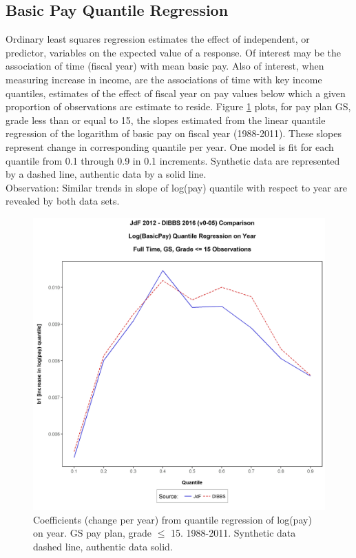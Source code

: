 \documentclass[10pt, letterpaper]{article}
\begin{document}
\begin{spacing}{1.0}
\clearpage

\subsection{Basic Pay Quantile Regression}

Ordinary least squares regression estimates the effect of independent, or predictor, variables on the expected value of a response.  Of interest may be the association of time (fiscal year) with mean basic pay.  Also of interest, when measuring increase in income, are the associations of time with key income quantiles, estimates of the effect of fiscal year on pay values below which a given proportion of observations are estimate to reside. Figure \ref{figure:BasicPayQuantileYearRegression} plots, for pay plan GS, grade less than or equal to 15, the slopes estimated from the linear quantile regression of the logarithm of basic pay on fiscal year (1988-2011).  These slopes represent change in corresponding quantile per year.  One model is fit for each quantile from 0.1 through 0.9 in 0.1 increments.  Synthetic data are represented by a dashed line, authentic data by a solid line.\\

Observation:  Similar trends in slope of log(pay) quantile with respect to year are revealed by both data sets.\\

\vspace{20pt}

\begin{figure}[h]
    \centering
    \includegraphics[width=6in, trim={0 0.6in 0 1in}, clip]{BasicPayQuantileYearRegression.png}
    \caption{Coefficients (change per year) from quantile regression of log(pay) on year.  GS pay plan, grade $\leq$ 15.  1988-2011.  Synthetic data dashed line, authentic data solid.}
    \label{figure:BasicPayQuantileYearRegression}
\end{figure}


\end{spacing}
\end{document}
